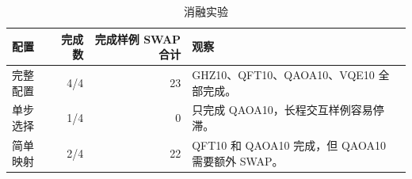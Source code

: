 \begin{table}[H]
  \centering
  \caption{消融实验}
  \label{tab:ablation-study}
  \begin{tabularx}{\linewidth}{lrrY}
    \toprule
    配置 & 完成数 & 完成样例 SWAP 合计 & 观察 \\
    \midrule
    完整配置 & 4/4 & 23 & GHZ10、QFT10、QAOA10、VQE10 全部完成。\\
    单步选择 & 1/4 & 0 & 只完成 QAOA10，长程交互样例容易停滞。\\
    简单映射 & 2/4 & 22 & QFT10 和 QAOA10 完成，但 QAOA10 需要额外 SWAP。\\
    \bottomrule
  \end{tabularx}
\end{table}
